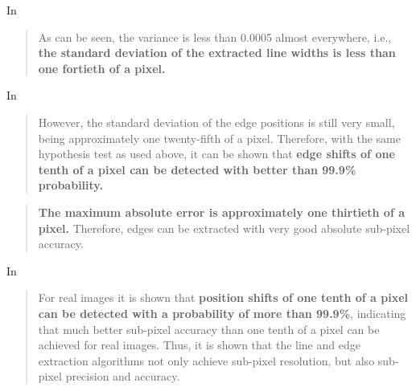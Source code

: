 \documentclass[a4paper,12pt]{article}
\begin{document}
In \cite[Section 5.3.2
Sub-Pixel Accuracy of Line Position and Width, p.165]{Steger}
\begin{quotation}
As can be seen, the variance is less than 0.0005 almost everywhere, i.e., \textbf{the standard
deviation of the extracted line widths is less than one fortieth of a pixel.}
\end{quotation}

In \cite[5.3.3 Sub-Pixel Accuracy of Edge Position, p.166]{Steger}
\begin{quotation}
However, the standard deviation of the edge positions is still very
small, being approximately one twenty-fifth of a pixel. Therefore, with the same hypothesis
test as used above, it can be shown that \textbf{edge shifts of one tenth of a pixel can be detected with
better than 99.9\% probability.}
\end{quotation}

\begin{quotation}
\textbf{The maximum absolute error is approximately one thirtieth of a pixel.} Therefore, edges can be
extracted with very good absolute sub-pixel accuracy.
\end{quotation}

In \cite[Chapter 6 Conclusions, p.168]{Steger}
\begin{quotation}
For real images it is shown that \textbf{position shifts of one tenth of a pixel can be
detected with a probability of more than 99.9\%}, indicating that much better sub-pixel accuracy
than one tenth of a pixel can be achieved for real images. Thus, it is shown that the line and
edge extraction algorithms not only achieve sub-pixel resolution, but also sub-pixel precision
and accuracy.
\end{quotation}








\printbibliography
\end{document}
